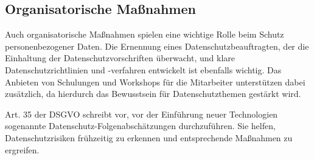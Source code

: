 \cite{conrad_2017}
\cite{mindverse2024}

\subsection{Organisatorische Maßnahmen}

Auch organisatorische Maßnahmen spielen eine wichtige Rolle beim Schutz
personenbezogener Daten. Die Ernennung eines Datenschutzbeauftragten, der die
Einhaltung der Datenschutzvorschriften überwacht, und klare
Datenschutzrichtlinien und -verfahren entwickelt ist ebenfalls wichtig. Das
Anbieten von Schulungen und Workshops für die Mitarbeiter unterstützen dabei
zusätzlich, da hierdurch das Bewusstsein für Datenschutzthemen gestärkt wird.

Art. 35 der DSGVO schreibt vor, vor der Einführung neuer Technologien sogenannte
Datenschutz-Folgenabschätzungen durchzuführen. Sie helfen, Datenschutzrisiken
frühzeitig zu erkennen und entsprechende Maßnahmen zu ergreifen.

\cite{conrad_2017}
